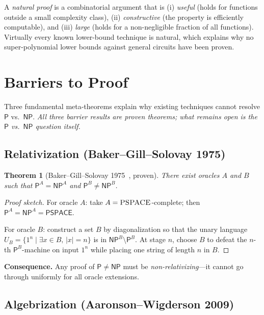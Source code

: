\documentclass[12pt,a4paper]{amsart}
\newtheorem{theorem}{Theorem}[section]
\theoremstyle{definition}
\newcommand{\Pclass}{\mathsf{P}}
\newcommand{\NP}{\mathsf{NP}}
\newcommand{\PSPACE}{\mathsf{PSPACE}}
\begin{document}
A \emph{natural proof} is a combinatorial argument that is (i) \emph{useful}
(holds for functions outside a small complexity class), (ii) \emph{constructive}
(the property is efficiently computable), and (iii) \emph{large} (holds for a
non-negligible fraction of all functions).  Virtually every known lower-bound
technique is natural, which explains why no super-polynomial lower bounds against
general circuits have been proven.

\section{Barriers to Proof}
\label{sec:barriers}

Three fundamental meta-theorems explain why existing techniques cannot resolve
$\Pclass$ vs.\ $\NP$.  \emph{All three barrier results are proven theorems;
what remains open is the $\Pclass$ vs.\ $\NP$ question itself.}

\subsection{Relativization (Baker--Gill--Solovay 1975)}

\begin{theorem}[Baker--Gill--Solovay 1975~\cite{baker1975}, proven]
There exist oracles $A$ and $B$ such that $\Pclass^A = \NP^A$ and
$\Pclass^B \neq \NP^B$.
\end{theorem}

\begin{proof}[Proof sketch]
For oracle $A$: take $A = \textsc{PSPACE}$-complete; then $\Pclass^A =
\NP^A = \PSPACE$.

For oracle $B$: construct a set $B$ by diagonalization so that the unary
language $U_B = \{1^n \mid \exists x\in B,\,|x|=n\}$ is in $\NP^B\setminus
\Pclass^B$.  At stage $n$, choose $B$ to defeat the $n$-th $\Pclass^B$-machine
on input $1^n$ while placing one string of length $n$ in $B$.
\end{proof}

\textbf{Consequence.}  Any proof of $\Pclass\neq\NP$ must be
\emph{non-relativizing}---it cannot go through uniformly for all oracle
extensions.

\subsection{Algebrization (Aaronson--Wigderson 2009)}
\end{document}
